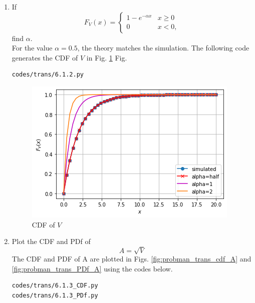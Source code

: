 \begin{enumerate}[label=\thesubsection.\arabic*.,ref=\thesubsection.\theenumi]
\item
If
%
\begin{equation}
F_{V}(x) = 
\begin{cases}
1 - e^{-\alpha x} & x \geq 0 \\
0 & x < 0,
\end{cases}
\label{eq:probman_F_V_alpha}
\end{equation}
%
find $\alpha$.
\\
\solution For the value $\alpha=0.5$, the theory matches the simulation.  
The following code generates the CDF of $V$ in Fig. \ref{fig:probman_F_V_alpha} 
Fig. 
\begin{lstlisting}
codes/trans/6.1.2.py
\end{lstlisting}
%
\begin{figure}[!ht]
\centering
\includegraphics[width=\columnwidth]{figs/trans/6.1.2.png}
\caption{CDF of $V$}
\label{fig:probman_F_V_alpha}
\end{figure}
%
%
\item
\label{ch3_raleigh_sim}
Plot the CDF and PDf of
%
\begin{equation}
A = \sqrt{V}
\end{equation}
%
\solution The CDF and PDF of A are plotted in Figs. \ref{fig:probman_trans_cdf_A} and \ref{fig:probman_trans_PDf_A}
using the codes below.
\begin{lstlisting}
codes/trans/6.1.3_CDF.py
codes/trans/6.1.3_PDf.py
\end{lstlisting}


\end{enumerate}
